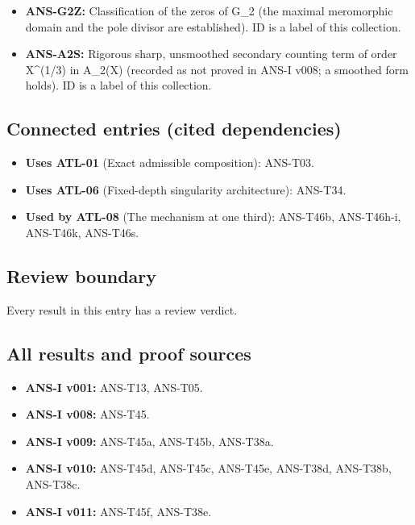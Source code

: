 \documentclass[
  11pt,
]{article}
\providecommand{\tightlist}{%
  \setlength{\itemsep}{0pt}\setlength{\parskip}{0pt}}
\begin{document}
\begin{itemize}
\tightlist
\item
  \textbf{ANS-G2Z:} Classification of the zeros of G\_2 (the maximal
  meromorphic domain and the pole divisor are established). ID is a
  label of this collection.
\item
  \textbf{ANS-A2S:} Rigorous sharp, unsmoothed secondary counting term
  of order X\^{}(1/3) in A\_2(X) (recorded as not proved in ANS-I v008;
  a smoothed form holds). ID is a label of this collection.
\end{itemize}

\hypertarget{connected-entries-cited-dependencies-6}{%
\subsection{Connected entries (cited
dependencies)}\label{connected-entries-cited-dependencies-6}}

\begin{itemize}
\tightlist
\item
  \textbf{Uses ATL-01} (Exact admissible composition): ANS-T03.
\item
  \textbf{Uses ATL-06} (Fixed-depth singularity architecture): ANS-T34.
\item
  \textbf{Used by ATL-08} (The mechanism at one third): ANS-T46b,
  ANS-T46h-i, ANS-T46k, ANS-T46s.
\end{itemize}

\hypertarget{review-boundary-6}{%
\subsection{Review boundary}\label{review-boundary-6}}

Every result in this entry has a review verdict.

\hypertarget{all-results-and-proof-sources-6}{%
\subsection{All results and proof
sources}\label{all-results-and-proof-sources-6}}

\begin{itemize}
\tightlist
\item
  \textbf{ANS-I v001:} ANS-T13, ANS-T05.
\item
  \textbf{ANS-I v008:} ANS-T45.
\item
  \textbf{ANS-I v009:} ANS-T45a, ANS-T45b, ANS-T38a.
\item
  \textbf{ANS-I v010:} ANS-T45d, ANS-T45c, ANS-T45e, ANS-T38d, ANS-T38b,
  ANS-T38c.
\item
  \textbf{ANS-I v011:} ANS-T45f, ANS-T38e.
\end{itemize}
\end{document}
